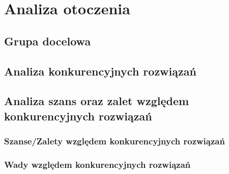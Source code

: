 \chapter{Analiza otoczenia}

\section{Grupa docelowa}
\section{Analiza konkurencyjnych rozwiązań}

\section{Analiza szans oraz zalet względem konkurencyjnych rozwiązań}
\subsection{Szanse/Zalety względem konkurencyjnych rozwiązań}
\subsection{Wady względem konkurencyjnych rozwiązań}
